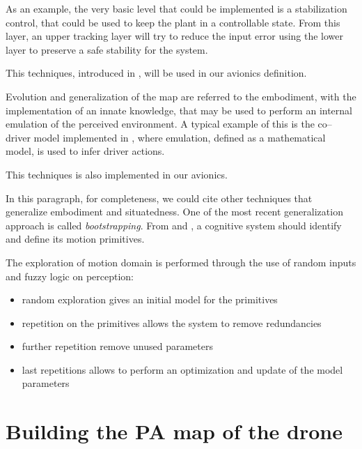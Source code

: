As an example, the very basic level that could be implemented is a stabilization control, that could be used to keep the plant in a controllable state. From this layer, an upper tracking layer will try to reduce the input error using the lower layer to preserve a safe stability for the system.

This techniques, introduced in \citep{layeredmobilerobot}, will be used in our avionics definition.

Evolution and generalization of the map are referred to the embodiment, with the implementation of an innate knowledge, that may be used to perform an internal emulation of the perceived environment. A typical example of this is the co--driver model implemented in \citep{artificialcodriver}, where emulation, defined as a mathematical model, is used to infer driver actions.

This techniques is also implemented in our avionics.

In this paragraph, for completeness, we could cite other techniques that generalize embodiment and situatedness. One of the most recent generalization approach is called \emph{bootstrapping}. From \citep{sun2001implicit} and \citep{hierarchicalbootstrapping}, a cognitive system should identify and define its motion primitives. 

The exploration of motion domain is performed through the use of random inputs and fuzzy logic\citep{aframeworkforhierarchicalperceptionaction} on perception:
\begin{itemize}
\item random exploration gives an initial model for the primitives
\item repetition on the primitives allows the system to remove redundancies
\item further repetition remove unused parameters
\item last repetitions allows to perform an optimization and update of the model parameters
\end{itemize}

\section{Building the PA map of the drone}


